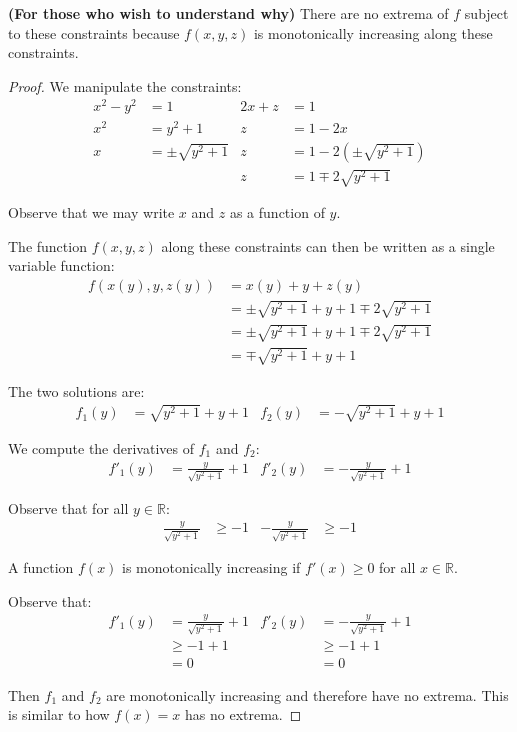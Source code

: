 \begin{claim}
    \textbf{(For those who wish to understand why)} There are no extrema of \(f\) subject to these constraints because \(f(x, y, z)\) is monotonically increasing along these constraints.
\end{claim}

\begin{proof}
    We manipulate the constraints:
    \begin{align*}
        x^2 - y^2 &= 1 & 2x + z &= 1 \\
        x^2 &= y^2 + 1 & z &= 1 - 2x \\
        x &= \pm \sqrt{y^2 + 1} & z &= 1 - 2\left(\pm \sqrt{y^2 + 1}\right) \\
        & & z &= 1 \mp 2\sqrt{y^2 + 1}
    \end{align*}
    
    Observe that we may write \(x\) and \(z\) as a function of \(y\). 
    
    The function \(f(x, y, z)\) along these constraints can then be written as a single variable function:
    \begin{align*}
        f(x(y), y, z(y)) &= x(y) + y + z(y) \\
        &= \pm \sqrt{y^2 + 1} + y + 1 \mp 2\sqrt{y^2 + 1} \\
        &= \pm \sqrt{y^2 + 1} + y + 1 \mp 2\sqrt{y^2 + 1} \\
        &= \mp \sqrt{y^2 + 1} + y + 1
    \end{align*}
    
    The two solutions are:
    \begin{align}
        f_1(y) &= \sqrt{y^2 + 1} + y + 1 & f_2(y) &= -\sqrt{y^2 + 1} + y + 1
    \end{align}
    
    We compute the derivatives of \(f_1\) and \(f_2\):
    \begin{align}
        f'_1(y) &= \frac{y}{\sqrt{y^2 + 1}} + 1 & f'_2(y) &= -\frac{y}{\sqrt{y^2 + 1}} + 1
    \end{align}
    
    Observe that for all \(y \in \mathbb{R}\):
    \begin{align}
        \frac{y}{\sqrt{y^2 + 1}} &\geq -1 & -\frac{y}{\sqrt{y^2 + 1}} &\geq -1
    \end{align}
    
    A function \(f(x)\) is monotonically increasing if \(f'(x) \geq 0\) for all \(x \in \mathbb{R}\).
    
    Observe that:
    \begin{align}
        f'_1(y) &= \frac{y}{\sqrt{y^2 + 1}} + 1 & f'_2(y) &= -\frac{y}{\sqrt{y^2 + 1}} + 1 \\
        &\geq -1 + 1 & &\geq -1 + 1 \\
        &= 0 & &= 0
    \end{align}
    
    Then \(f_1\) and \(f_2\) are monotonically increasing and therefore have no extrema. This is similar to how \(f(x) = x\) has no extrema.
\end{proof}

